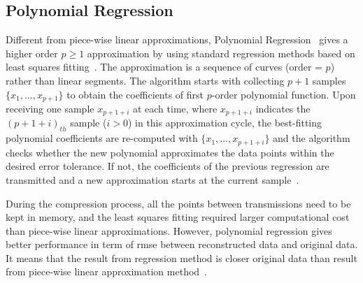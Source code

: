 \subsection{Polynomial Regression}
\label{sec:polynomial}

Different from piece-wise linear approximations, Polynomial
Regression~\cite{zordan2014performance} gives a higher order $p \geqslant1$
approximation by using standard regression methods based on least squares
fitting~\cite{phillips2003interpolation}. The approximation is a sequence of
curves (order = $p$) rather than linear segments. The algorithm starts with
collecting $p+1$ samples $\{x_1, ..., x_{p+1} \}$ to obtain the coefficients of
first $p$-order polynomial function. Upon receiving one sample $x_{p+1+i}$ at
each time, where $x_{p+1+i}$ indicates the $(p+1+i)_{th}$ sample ($i>0$) in this
approximation cycle, the best-fitting polynomial coefficients are re-computed
with $\{ x_1, ..., x_{p+1+i}\}$ and the algorithm checks whether the new
polynomial approximates the data points within the desired error tolerance. If
not, the coefficients of the previous regression are transmitted and a new
approximation starts at the current sample~\cite{zordan2014performance}.

During the compression process, all the points between transmissions need to be
kept in memory, and the least squares fitting required larger computational cost
than piece-wise linear approximations. However, polynomial regression gives
better performance in term of \acrfull{rmse} between
reconstructed data and original data. It means that the result from regression
method is closer original data than result from piece-wise linear approximation
method~\cite{zordan2014performance}.



